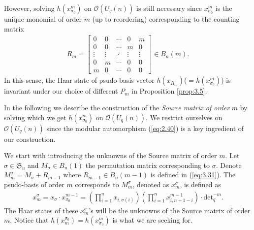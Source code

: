 \documentclass[table,a4paper,reqno]{amsart}
\numberwithin{equation}{section}
\theoremstyle{definition}
\begin{document}

However, solving $h(x^m_{\sigma_0})$ on $\mathcal{O}(U_q(n))$ is still necessary since $x^m_{\sigma_0}$ is the unique monomial of order $m$ (up to reordering) corresponding to the counting matrix
\begin{align}\label{eq:3.31}
    R_m=\begin{bmatrix}
        0&0&\cdots&0&m\\
        0&0&\cdots&m&0\\
    \vdots&\vdots&\iddots&\vdots&\vdots\\  
    0&m&\cdots&0&0\\
    m&0&\cdots&0&0
    \end{bmatrix}\in B_n(m).
\end{align}
In this sense, the Haar state of psudo-basis vector $h(x_{R_m})$($=h(x^m_{\sigma_0})$) is invariant under our choice of different $P_m$ in Proposition \ref{prop:3.5}. 

In the following we describe the construction of the \textit{Source matrix of order} $m$ by solving which we get $h(x^m_{\sigma_0})$ on $\mathcal{O}(U_q(n))$. We restrict ourselves on $\mathcal{O}(U_q(n))$ since the modular automorphism (\ref{eq:2.40}) is a key ingredient of our construction.

We start with introducing the unknowns of the Source matrix of order $m$. Let $\sigma\in\mathfrak{S}_n$ and $M_\sigma\in B_n(1)$ the permutation matrix corresponding to $\sigma$. Denote $M_m^\sigma=M_\sigma+R_{m-1}$ where $R_{m-1}\in B_n(m-1)$ is defined in (\ref{eq:3.31}). The psudo-basis of order $m$ corresponds to $M_m^\sigma$, denoted as $x_{m}^\sigma$, is defined as 
\begin{align}\label{eq:3.32}
    x_{m}^\sigma=x_\sigma\cdot x_{\sigma_0}^{m-1}=\left(\prod_{i=1}^nx_{i,\sigma(i)}\right)\left(\prod_{i=1}^nx^{m-1}_{i,n+1-i}\right)\cdot \text{det}_q^{-m}.
\end{align}
The Haar states of these $x_{m}^\sigma$'s will be the unknowns of the Source matrix of order $m$. Notice that $h(x_{m}^{\sigma_0})=h(x_{\sigma_0}^{m})$ is what we are seeking for.
\end{document}
